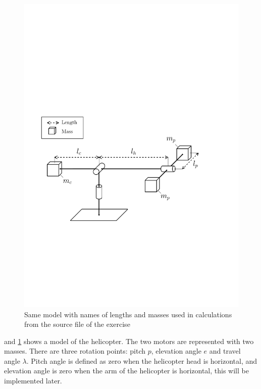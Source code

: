 \begin{figure}[h!] 
    \begin{center}
    \includegraphics[scale=0.65]{Figures/masses.pdf}
    \caption{Same model with names of lengths and masses used in calculations from the source file of the exercise} 
    \label{fig:helic_model_masses}  
    \end{center}
\end{figure}
 and \cref{fig:helic_model_masses} shows a model of the helicopter. The two motors are represented with two masses. There are three rotation points: pitch $p$, elevation angle $e$ and travel angle $\lambda$. Pitch angle is defined as zero when the helicopter head is horizontal, and elevation angle is zero when the arm of the helicopter is horizontal, this will be implemented later. 

